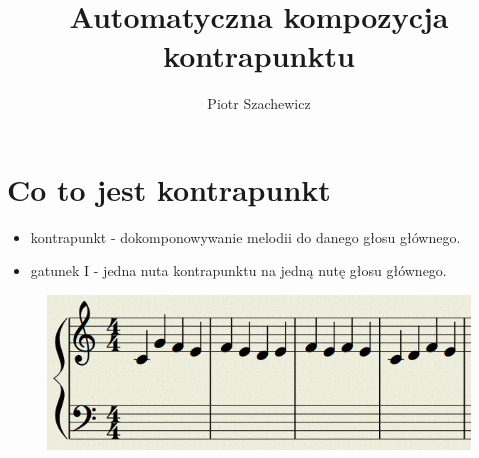 \documentclass{beamer}
\title %
{Automatyczna kompozycja kontrapunktu}
\author %
{Piotr Szachewicz}
\begin{document}
\begin{frame}
  \titlepage
\end{frame}







\section{Co to jest kontrapunkt}

\begin{frame}

  \begin{itemize}
  	\item kontrapunkt - dokomponowywanie melodii do danego głosu głównego.
	\item gatunek I - jedna nuta kontrapunktu na jedną nutę głosu głównego.
  \end{itemize}
\end{frame}

\begin{frame}
	\begin{figure}
	   \includegraphics[scale=0.4]{images/pusty.png}
	\end{figure}
\end{frame}
\end{document}
